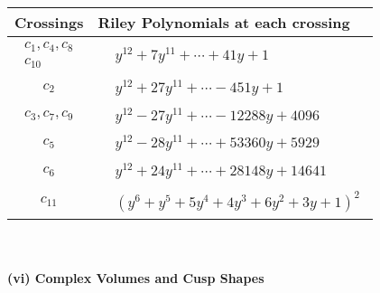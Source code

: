 \documentclass[1p]{elsarticle_modified}
\theoremstyle{definition}
\begin{document}
\begin{tabular}{m{50pt}|m{274pt}}
Crossings & \hspace{64pt}Riley Polynomials at each crossing \\
\hline $$\begin{aligned}c_{1},c_{4},c_{8}\\c_{10}\end{aligned}$$&$\begin{aligned}
&y^{12}+7 y^{11}+\cdots+41 y+1
\end{aligned}$\\
\hline $$\begin{aligned}c_{2}\end{aligned}$$&$\begin{aligned}
&y^{12}+27 y^{11}+\cdots-451 y+1
\end{aligned}$\\
\hline $$\begin{aligned}c_{3},c_{7},c_{9}\end{aligned}$$&$\begin{aligned}
&y^{12}-27 y^{11}+\cdots-12288 y+4096
\end{aligned}$\\
\hline $$\begin{aligned}c_{5}\end{aligned}$$&$\begin{aligned}
&y^{12}-28 y^{11}+\cdots+53360 y+5929
\end{aligned}$\\
\hline $$\begin{aligned}c_{6}\end{aligned}$$&$\begin{aligned}
&y^{12}+24 y^{11}+\cdots+28148 y+14641
\end{aligned}$\\
\hline $$\begin{aligned}c_{11}\end{aligned}$$&$\begin{aligned}
&(y^6+y^5+5 y^4+4 y^3+6 y^2+3 y+1)^2
\end{aligned}$\\
\hline
\end{tabular}\\~\\
\newpage\flushleft \textbf{(vi) Complex Volumes and Cusp Shapes}
\end{document}
